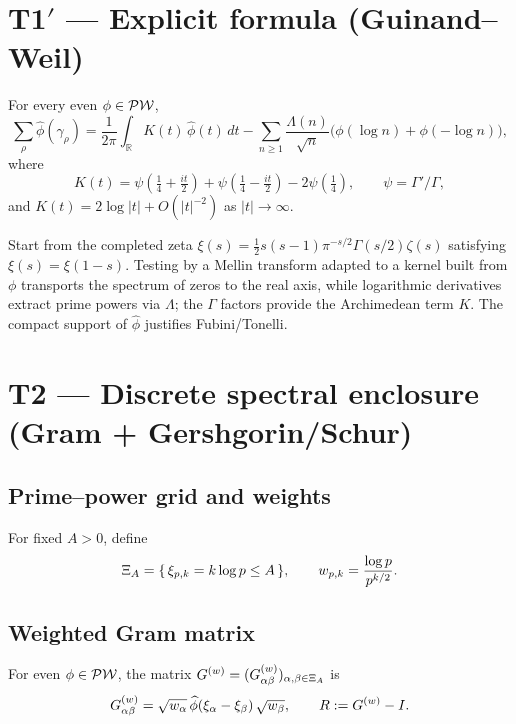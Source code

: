 \documentclass[11pt,a4paper]{proofarticle}
\begin{document}
\section{\texorpdfstring{T1$′$ — Explicit formula (Guinand–Weil)}{T1′ — Explicit formula (Guinand–Weil)}}
\begin{theorem}\label{thm:T1prime}
For every even $\phi\in\mathcal{PW}$,
\begin{equation}\label{eq:explicit}
\sum_{\rho}\widehat\phi(\gamma_\rho)
=\frac{1}{2\pi}\int_{\mathbb R}K(t)\,\widehat\phi(t)\,dt
-\sum_{n\ge 1}\frac{\Lambda(n)}{\sqrt{n}}\big(\phi(\log n)+\phi(-\log n)\big),
\end{equation}
where
\[
K(t)=\psi\!\left(\tfrac14+\tfrac{it}{2}\right)+\psi\!\left(\tfrac14-\tfrac{it}{2}\right)-2\psi\!\left(\tfrac14\right),
\qquad \psi=\Gamma'/\Gamma,
\]
and $K(t)=2\log|t|+O(|t|^{-2})$ as $|t|\to\infty$.
\end{theorem}

\begin{remark}
Start from the completed zeta $\xi(s)=\tfrac12 s(s-1)\pi^{-s/2}\Gamma(s/2)\zeta(s)$ satisfying
$\xi(s)=\xi(1-s)$. Testing by a Mellin transform adapted to a kernel built from $\phi$ transports
the spectrum of zeros to the real axis, while logarithmic derivatives extract prime powers
via $\Lambda$; the $\Gamma$ factors provide the Archimedean term $K$. The compact support of $\widehat\phi$
justifies Fubini/Tonelli.
\end{remark}

\section{T2 — Discrete spectral enclosure (Gram + Gershgorin/Schur)}
\subsection{Prime–power grid and weights}
For fixed $A>0$, define
\[
\Xi_A=\{\,\xi_{p,k}=k\log p\le A\,\},\qquad
w_{p,k}=\frac{\log p}{p^{k/2}}.
\]

\subsection{Weighted Gram matrix}
For even $\phi\in\mathcal{PW}$, the matrix $G^{(w)}=(G^{(w)}_{\alpha\beta})_{\alpha,\beta\in\Xi_A}$ is
\[
G^{(w)}_{\alpha\beta}=\sqrt{w_\alpha}\,\widehat\phi(\xi_\alpha-\xi_\beta)\,\sqrt{w_\beta},\qquad
R:=G^{(w)}-I.
\]
\end{document}
